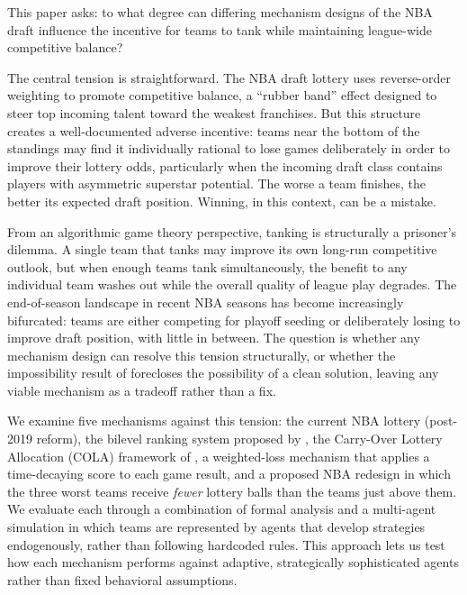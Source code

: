 \documentclass{article}
\begin{document}
This paper asks: to what degree can differing mechanism designs of the NBA
draft influence the incentive for teams to tank while maintaining league-wide
competitive balance?

The central tension is straightforward.
The NBA draft lottery uses reverse-order weighting to promote competitive
balance, a ``rubber band'' effect designed to steer top incoming talent toward
the weakest franchises.
But this structure creates a well-documented adverse incentive: teams near the
bottom of the standings may find it individually rational to lose games
deliberately in order to improve their lottery odds, particularly when the
incoming draft class contains players with asymmetric superstar potential.
The worse a team finishes, the better its expected draft position.
Winning, in this context, can be a mistake.

From an algorithmic game theory perspective, tanking is structurally a
prisoner's dilemma.
A single team that tanks may improve its own long-run competitive outlook, but
when enough teams tank simultaneously, the benefit to any individual team
washes out while the overall quality of league play degrades.
The end-of-season landscape in recent NBA seasons has become increasingly
bifurcated: teams are either competing for playoff seeding or deliberately
losing to improve draft position, with little in between.
The question is whether any mechanism design can resolve this tension
structurally, or whether the impossibility result of \citet{banchio2020}
forecloses the possibility of a clean solution, leaving any viable mechanism
as a tradeoff rather than a fix.

We examine five mechanisms against this tension: the current NBA lottery
(post-2019 reform), the bilevel ranking system proposed by
\citet{kazachkov2020}, the Carry-Over Lottery Allocation (COLA) framework of
\citet{highley2026}, a weighted-loss mechanism that applies a time-decaying
score to each game result, and a proposed NBA redesign in which the three
worst teams receive \emph{fewer} lottery balls than the teams just above them.
We evaluate each through a combination of formal analysis and a multi-agent
simulation in which teams are represented by agents that develop strategies
endogenously, rather than following hardcoded rules.
This approach lets us test how each mechanism performs against adaptive,
strategically sophisticated agents rather than fixed behavioral assumptions.
\end{document}
